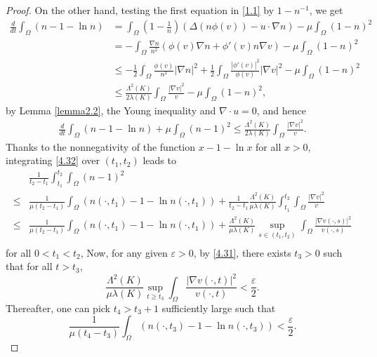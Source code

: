 \documentclass[12pt]{article}
\theoremstyle{plain}
\theoremstyle{definition}
\numberwithin{equation}{section}
\begin{document}
\begin{proof}[Proof]
On the other hand, testing the first equation in \eqref{1.1} by $1-n^{-1}$, we get
\begin{equation*}
\begin{split}
\frac d{dt}\int_\Omega(n-1-\ln n)
&=\int_\Omega (1-\frac 1 n)
(\Delta (n\phi(v))-u\cdot\nabla n)- \mu\int_\Omega(1- n)^2\\
&=-\int_\Omega\frac{\nabla n}{n^2}
(\phi(v) \nabla n+\phi'(v)n \nabla v )- \mu\int_\Omega(1- n)^2\\
&\leq -\frac12\int_\Omega \frac{\phi(v)} {n^2}|\nabla n|^2+ \frac12
\int_\Omega \frac{|\phi'(v)|^2} {\phi(v)} |\nabla v|^2- \mu\int_\Omega(1- n)^2\\
&\leq
\frac{\Lambda^2(K)}{2\lambda(K)}\int_\Omega \frac {|\nabla v|^2}v - \mu\int_\Omega(1- n)^2,
\end{split}
\end{equation*}
by Lemma \ref{lemma2.2}, the Young inequality and $\nabla\cdot u=0$,
and hence
\begin{equation}\label{4.32}
\begin{split}
\frac d{dt}\int_\Omega(n-1-\ln n)
+ \mu\int_\Omega(n-1)^2\leq
\frac{\Lambda^2(K)}{2\lambda(K)}\int_\Omega \frac {|\nabla v|^2}v.
\end{split}
\end{equation}
Thanks to the nonnegativity of the function $x-1-\ln x $ for all $x>0$,  integrating  \eqref{4.32} over $(t_1,t_2)$
leads to
\begin{equation}\label{4.33}
\begin{split}
&\frac{1}{t_2-t_1}\int^{t_2}_{t_1}\int_\Omega(n-1)^2\\
\leq &\frac{1}{\mu(t_2-t_1)} \int_\Omega(n(\cdot,t_1)-1-\ln n(\cdot,t_1))
+
\frac{1}{t_2-t_1}\frac{\Lambda^2(K)}{\mu\lambda(K)}\int^{t_2}_{t_1} \int_\Omega \frac {|\nabla v|^2}v
\\
\leq& \frac{1}{\mu(t_2-t_1)} \int_\Omega(n(\cdot,t_1)-1-\ln n(\cdot,t_1))
+
\frac{\Lambda^2(K)}{\mu\lambda(K)}\sup_{s\in (t_1,t_2)} \int_\Omega \frac {|\nabla v(\cdot,s)|^2}{v(\cdot,s)}\\
\end{split}
\end{equation}
for all $0<t_1<t_2$, Now, for any given $\varepsilon>0$, by \eqref{4.31}, there exists $t_3>0$ such that for all $t>t_3$,
$$\frac{\Lambda^2(K)}{\mu\lambda(K)}\sup_{t\geq t_3} \int_\Omega \frac {|\nabla v(\cdot,t)|^2}{v(\cdot,t)}< \frac \varepsilon 2.
$$
Thereafter, one can pick $t_4>t_3+1$ sufficiently large such that
$$\frac{1}{\mu(t_4-t_3)} \int_\Omega(n(\cdot,t_3)-1-\ln n(\cdot,t_3))< \frac \varepsilon 2.
$$
\end{proof}
\end{document}
